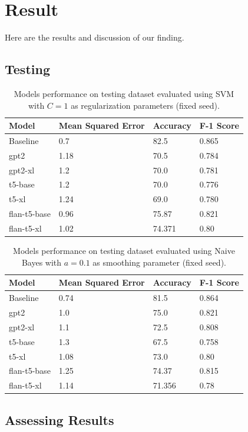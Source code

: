 \documentclass{article}
\begin{document}
\section{Result}
Here are the results and discussion of our finding.
\subsection{Testing}


\begin{table}[h]
\centering
\begin{tabular}{llll}
\toprule
\textbf{Model} & \textbf{Mean Squared Error} & \textbf{Accuracy} & \textbf{F-1 Score} \\
\midrule
Baseline & 0.7 & 82.5 & 0.865 \\
gpt2 & 1.18 & 70.5 & 0.784 \\
gpt2-xl & 1.2 & 70.0 & 0.781 \\
t5-base & 1.2 & 70.0 & 0.776 \\
t5-xl & 1.24 & 69.0 & 0.780\\
flan-t5-base & 0.96 & 75.87 & 0.821 \\
flan-t5-xl & 1.02 & 74.371 & 0.80 \\
\bottomrule
\end{tabular}
\caption{Models performance on testing dataset evaluated using SVM with $C=1$ as regularization parameters (fixed seed).}
\end{table}

\begin{table}[h]
\centering
\begin{tabular}{llll}
\toprule
\textbf{Model} & \textbf{Mean Squared Error} & \textbf{Accuracy} & \textbf{F-1 Score} \\
\midrule
Baseline & 0.74 & 81.5 & 0.864 \\
gpt2 & 1.0 & 75.0 & 0.821 \\
gpt2-xl & 1.1 & 72.5 & 0.808 \\
t5-base & 1.3 & 67.5 & 0.758 \\
t5-xl & 1.08 & 73.0 & 0.80\\
flan-t5-base & 1.25 & 74.37 & 0.815 \\
flan-t5-xl & 1.14 & 71.356 & 0.78 \\
\bottomrule
\end{tabular}
\caption{Models performance on testing dataset evaluated using Naive Bayes with $a=0.1$ as smoothing parameter (fixed seed).}
\end{table}


\subsection{Assessing Results}
\end{document}
